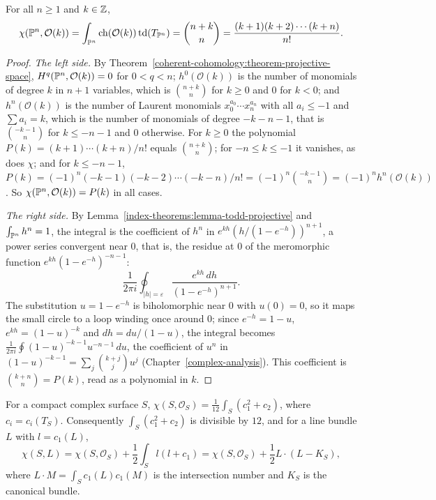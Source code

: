 \begin{proposition}\label{index-theorems:proposition-rr-projective}
For all $n \geq 1$ and $k \in \mathbb{Z}$,
\[
\chi(\mathbb{P}^n, \mathcal{O}(k)) = \int_{\mathbb{P}^n}\mathrm{ch}(\mathcal{O}(k))\,\mathrm{td}(T_{\mathbb{P}^n}) = \binom{n + k}{n} = \frac{(k + 1)(k + 2)\cdots(k + n)}{n!}.
\]
\end{proposition}

\begin{proof}
\emph{The left side.} By Theorem~\ref{coherent-cohomology:theorem-projective-space}, $H^q(\mathbb{P}^n, \mathcal{O}(k)) = 0$ for $0 < q < n$; $h^0(\mathcal{O}(k))$ is the number of monomials of degree $k$ in $n + 1$ variables, which is
$\binom{n+k}{n}$ for $k \geq 0$ and $0$ for $k < 0$; and $h^n(\mathcal{O}(k))$ is the number of Laurent monomials $x_0^{a_0}\cdots x_n^{a_n}$ with all $a_i \leq -1$ and $\sum a_i = k$, which is the number of monomials of degree $-k - n - 1$,
that is $\binom{-k-1}{n}$ for $k \leq -n - 1$ and $0$ otherwise. For $k \geq 0$ the polynomial $P(k) = (k + 1)\cdots(k + n)/n!$ equals $\binom{n+k}{n}$; for $-n \leq k \leq -1$ it vanishes, as does $\chi$; and for $k \leq -n - 1$,
$P(k) = (-1)^n(-k - 1)(-k - 2)\cdots(-k - n)/n! = (-1)^n\binom{-k-1}{n} = (-1)^nh^n(\mathcal{O}(k))$. So $\chi(\mathbb{P}^n, \mathcal{O}(k)) = P(k)$ in all cases.

\emph{The right side.} By Lemma~\ref{index-theorems:lemma-todd-projective} and $\int_{\mathbb{P}^n}h^n = 1$, the integral is the coefficient of $h^n$ in $e^{kh}(h/(1 - e^{-h}))^{n+1}$, a power series convergent near $0$, that is, the residue at
$0$ of the meromorphic function $e^{kh}(1 - e^{-h})^{-n-1}$:
\[
\frac{1}{2\pi i}\oint_{|h| = \varepsilon}\frac{e^{kh}\,dh}{(1 - e^{-h})^{n+1}}.
\]
The substitution $u = 1 - e^{-h}$ is biholomorphic near $0$ with $u(0) = 0$, so it maps the small circle to a loop winding once around $0$; since $e^{-h} = 1 - u$, $e^{kh} = (1 - u)^{-k}$ and $dh = du/(1 - u)$, the integral becomes
$\frac{1}{2\pi i}\oint(1 - u)^{-k-1}u^{-n-1}\,du$, the coefficient of $u^n$ in $(1 - u)^{-k-1} = \sum_j\binom{k + j}{j}u^j$ (Chapter~\ref{complex-analysis}). This coefficient is $\binom{k+n}{n} = P(k)$, read as a polynomial in $k$.
\end{proof}

\begin{corollary}\label{index-theorems:corollary-noether}
For a compact complex surface $S$, $\chi(S, \mathcal{O}_S) = \frac{1}{12}\int_S(c_1^2 + c_2)$, where $c_i = c_i(T_S)$. Consequently $\int_S(c_1^2 + c_2)$ is divisible by $12$, and for a line bundle $L$ with $l = c_1(L)$,
\[
\chi(S, L) = \chi(S, \mathcal{O}_S) + \frac12\int_Sl(l + c_1) = \chi(S, \mathcal{O}_S) + \frac12L \cdot (L - K_S),
\]
where $L \cdot M = \int_Sc_1(L)c_1(M)$ is the intersection number and $K_S$ is the canonical bundle.
\end{corollary}

